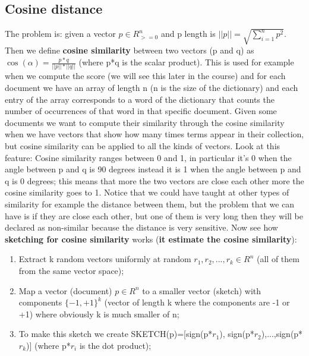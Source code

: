 \subsection{Cosine distance}
The problem is: given a vector $p \in R_{>= 0}^n$ and p length is $||p||= \sqrt{\sum_{i=1}^n p^2}$. Then we define \textbf{cosine similarity} between two vectors (p and q) as $\cos(\alpha)=\frac{p*q}{||p||*||q||}$ (where p*q is the scalar product).\newline
This is used for example when we compute the score (we will see this later in the course) and for each document we have an array of length n (n is the size of the dictionary) and each entry of the array corresponds to a word of the dictionary that counts the number of occurrences of that word in that specific document. Given some documents we want to compute their similarity through the cosine similarity when we have vectors that show how many times terms appear in their collection, but cosine similarity can be applied to all the kinds of vectors.\newline
Look at this feature: Cosine similarity ranges between 0 and 1, in particular it's 0 when the angle between p and q is 90 degrees instead it is 1 when the angle between p and q is 0 degrees; this means that more the two vectors are close each other more the cosine similarity goes to 1.\newline
Notice that we could have taught at other types of similarity for example the distance between them, but the problem that we can have is if they are close each other, but one of them is very long then they will be declared as non-similar because the distance is very sensitive.\newline
Now see how \textbf{sketching for cosine similarity} works (\textbf{it estimate the cosine similarity}):
\begin{enumerate}
    \item Extract k random vectors uniformly at random $r_1,r_2,...,r_k \in R^n$ (all of them from the same vector space);
    \item Map a vector (document) $p \in R^n$ to a smaller vector (sketch) with components $\{-1,+1\}^k$ (vector of length k where the components are -1 or +1) where obviously k is much smaller of n;
    \item To make this sketch we create SKETCH(p)=[sign(p*$r_1$), sign(p*$r_2$),...,sign(p*$r_k$)] (where p*$r_i$ is the dot product);
\end{enumerate}
